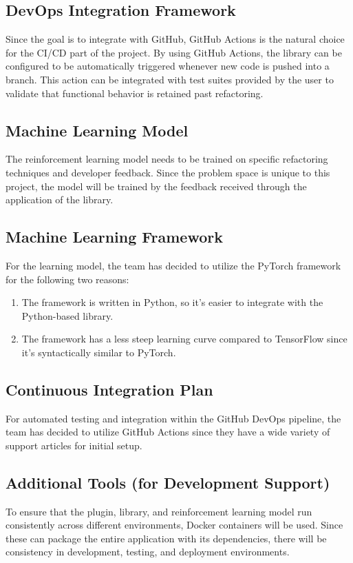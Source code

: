 \documentclass{article}
\begin{document}
\subsection{DevOps Integration Framework}
Since the goal is to integrate with GitHub, GitHub Actions is the natural choice for the CI/CD part of the project. By using GitHub Actions, the library can be configured to be automatically triggered whenever new code is pushed into a branch. This action can be integrated with test suites provided by the user to validate that functional behavior is retained past refactoring.

\subsection{Machine Learning Model}
The reinforcement learning model needs to be trained on specific refactoring techniques and developer feedback. Since the problem space is unique to this project, the model will be trained by the feedback received through the application of the library.

\subsection{Machine Learning Framework}
For the learning model, the team has decided to utilize the PyTorch framework for the following two reasons:
\begin{enumerate}
    \item The framework is written in Python, so it's easier to integrate with the Python-based library.
    \item The framework has a less steep learning curve compared to TensorFlow since it’s syntactically similar to PyTorch.
\end{enumerate}

\subsection{Continuous Integration Plan}
For automated testing and integration within the GitHub DevOps pipeline, the team has decided to utilize GitHub Actions since they have a wide variety of support articles for initial setup.

\subsection{Additional Tools (for Development Support)}
To ensure that the plugin, library, and reinforcement learning model run consistently across different environments, Docker containers will be used. Since these can package the entire application with its dependencies, there will be consistency in development, testing, and deployment environments.
\end{document}
